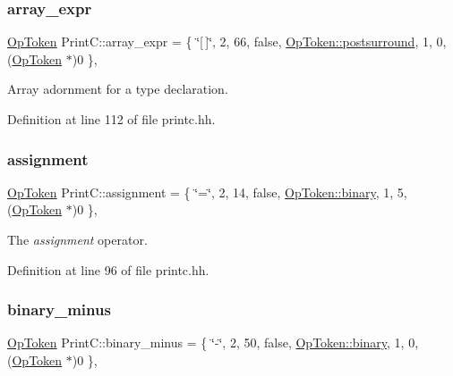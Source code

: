 \subsubsection{\texorpdfstring{array\_expr}{array\_expr}}
{\footnotesize\ttfamily \mbox{\hyperlink{class_op_token}{Op\+Token}} Print\+C\+::array\+\_\+expr = \{ \char`\"{}\mbox{[}$\,$\mbox{]}\char`\"{}, 2, 66, false, \mbox{\hyperlink{class_op_token_af41c7f108d5662ede7765c5a6c44eaffa82a30068870b08542e958e828d6464fa}{Op\+Token\+::postsurround}}, 1, 0, (\mbox{\hyperlink{class_op_token}{Op\+Token}} $\ast$)0 \}\hspace{0.3cm}{\ttfamily [static]}, {\ttfamily [protected]}}



Array adornment for a type declaration. 



Definition at line 112 of file printc.\+hh.

\mbox{\label{class_print_c_a2d38a1553e6270e9940922c549411eae}} 
\subsubsection{\texorpdfstring{assignment}{assignment}}
{\footnotesize\ttfamily \mbox{\hyperlink{class_op_token}{Op\+Token}} Print\+C\+::assignment = \{ \char`\"{}=\char`\"{}, 2, 14, false, \mbox{\hyperlink{class_op_token_af41c7f108d5662ede7765c5a6c44eaffa3a2ec63522a9329a71ddbe8adc3e752d}{Op\+Token\+::binary}}, 1, 5, (\mbox{\hyperlink{class_op_token}{Op\+Token}} $\ast$)0 \}\hspace{0.3cm}{\ttfamily [static]}, {\ttfamily [protected]}}



The {\itshape assignment} operator. 



Definition at line 96 of file printc.\+hh.

\mbox{\label{class_print_c_a3e8face6aa64fd484de1a532f837db5b}} 
\subsubsection{\texorpdfstring{binary\_minus}{binary\_minus}}
{\footnotesize\ttfamily \mbox{\hyperlink{class_op_token}{Op\+Token}} Print\+C\+::binary\+\_\+minus = \{ \char`\"{}-\/\char`\"{}, 2, 50, false, \mbox{\hyperlink{class_op_token_af41c7f108d5662ede7765c5a6c44eaffa3a2ec63522a9329a71ddbe8adc3e752d}{Op\+Token\+::binary}}, 1, 0, (\mbox{\hyperlink{class_op_token}{Op\+Token}} $\ast$)0 \}\hspace{0.3cm}{\ttfamily [static]}, {\ttfamily [protected]}}



